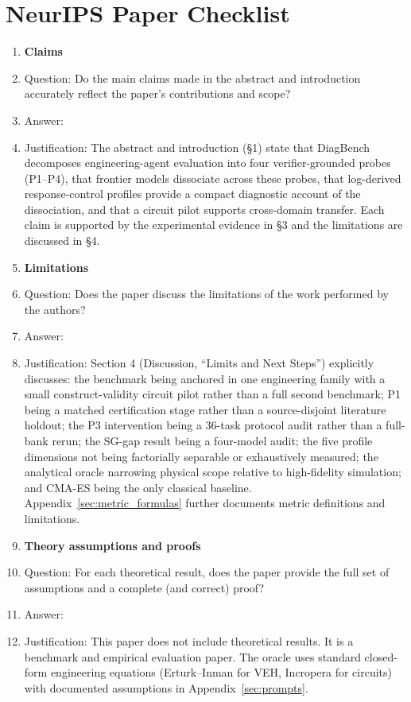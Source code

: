\section*{NeurIPS Paper Checklist}

\begin{enumerate}

\item {\bf Claims}
    \item[] Question: Do the main claims made in the abstract and introduction accurately reflect the paper's contributions and scope?
    \item[] Answer: \answerYes{}
    \item[] Justification: The abstract and introduction (§1) state that DiagBench decomposes engineering-agent evaluation into four verifier-grounded probes (P1--P4), that frontier models dissociate across these probes, that log-derived response-control profiles provide a compact diagnostic account of the dissociation, and that a circuit pilot supports cross-domain transfer. Each claim is supported by the experimental evidence in §3 and the limitations are discussed in §4.

\item {\bf Limitations}
    \item[] Question: Does the paper discuss the limitations of the work performed by the authors?
    \item[] Answer: \answerYes{}
    \item[] Justification: Section 4 (Discussion, ``Limits and Next Steps'') explicitly discusses: the benchmark being anchored in one engineering family with a small construct-validity circuit pilot rather than a full second benchmark; P1 being a matched certification stage rather than a source-disjoint literature holdout; the P3 intervention being a 36-task protocol audit rather than a full-bank rerun; the SG-gap result being a four-model audit; the five profile dimensions not being factorially separable or exhaustively measured; the analytical oracle narrowing physical scope relative to high-fidelity simulation; and CMA-ES being the only classical baseline. Appendix~\ref{sec:metric_formulas} further documents metric definitions and limitations.

\item {\bf Theory assumptions and proofs}
    \item[] Question: For each theoretical result, does the paper provide the full set of assumptions and a complete (and correct) proof?
    \item[] Answer: \answerNA{}
    \item[] Justification: This paper does not include theoretical results. It is a benchmark and empirical evaluation paper. The oracle uses standard closed-form engineering equations (Erturk--Inman for VEH, Incropera for circuits) with documented assumptions in Appendix~\ref{sec:prompts}.


\end{enumerate}
